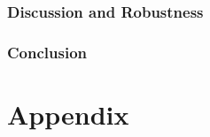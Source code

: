 \documentclass[11pt,letterpaper]{article}
\begin{document}


\section{Discussion and Robustness}
  
\section{Conclusion}\label{sec:conclusion}

\clearpage	
{\small
	
	
}	
\clearpage

\appendix 
	\part*{Appendix}\label{app:dix}
	\renewcommand*{\thepage}{A\arabic{page}}
	\renewcommand{\thetable}{A\arabic{table}}
	
\end{document}
